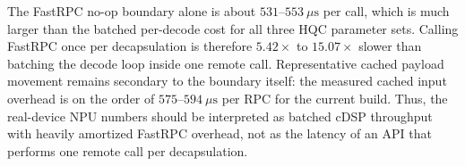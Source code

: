 The FastRPC no-op boundary alone is about \(531\)--\(553\ \mu\mathrm{s}\) per call, which
is much larger than the batched per-decode cost for all three HQC parameter
sets. Calling FastRPC once per decapsulation is therefore \(5.42\times\) to
\(15.07\times\) slower than batching the decode loop inside one remote call.
Representative cached payload movement remains secondary to the boundary
itself: the measured cached input overhead is on the order of \(575\)--\(594\ \mu\mathrm{s}\)
per RPC for the current build. Thus, the real-device NPU numbers
should be interpreted as batched cDSP throughput with heavily amortized FastRPC
overhead, not as the latency of an API that performs one remote call per
decapsulation.
    
